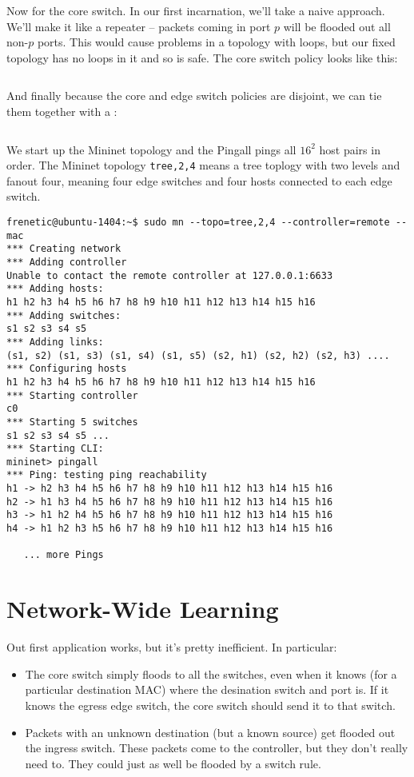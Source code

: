 Now for the core switch.  In our first incarnation, we'll take a naive approach.  We'll make it like
a repeater -- packets coming in port $p$ will be flooded out all non-$p$ ports.  This would cause problems
in a topology with loops, but our fixed topology has no loops in it and so is safe.  The core
switch policy looks like this:

\inputminted[firstline=42,lastline=49]{python}{code/multiswitch_topologies/multiswitch1.py}

And finally because the core and edge switch policies are disjoint, we can tie them together with a 
:

\inputminted[firstline=51,lastline=52]{python}{code/multiswitch_topologies/multiswitch1.py}

We start up the Mininet topology and the Pingall pings all $16^2$ host pairs in order.  The Mininet 
topology \texttt{tree,2,4} means a tree toplogy with two levels and fanout four, meaning four
edge switches and four hosts connected to each edge switch.   

\begin{verbatim}
frenetic@ubuntu-1404:~$ sudo mn --topo=tree,2,4 --controller=remote --mac
*** Creating network
*** Adding controller
Unable to contact the remote controller at 127.0.0.1:6633
*** Adding hosts:
h1 h2 h3 h4 h5 h6 h7 h8 h9 h10 h11 h12 h13 h14 h15 h16
*** Adding switches:
s1 s2 s3 s4 s5
*** Adding links:
(s1, s2) (s1, s3) (s1, s4) (s1, s5) (s2, h1) (s2, h2) (s2, h3) ....
*** Configuring hosts
h1 h2 h3 h4 h5 h6 h7 h8 h9 h10 h11 h12 h13 h14 h15 h16
*** Starting controller
c0
*** Starting 5 switches
s1 s2 s3 s4 s5 ...
*** Starting CLI:
mininet> pingall
*** Ping: testing ping reachability
h1 -> h2 h3 h4 h5 h6 h7 h8 h9 h10 h11 h12 h13 h14 h15 h16
h2 -> h1 h3 h4 h5 h6 h7 h8 h9 h10 h11 h12 h13 h14 h15 h16
h3 -> h1 h2 h4 h5 h6 h7 h8 h9 h10 h11 h12 h13 h14 h15 h16
h4 -> h1 h2 h3 h5 h6 h7 h8 h9 h10 h11 h12 h13 h14 h15 h16

   ... more Pings
\end{verbatim}

\section{Network-Wide Learning}

Out first application works, but it's pretty inefficient.  In particular:

\begin{itemize}
\item The core switch simply floods to all the switches, even when it knows (for a particular destination MAC)
where the desination switch and port is.  If it knows the egress edge switch, the core switch should send it to that switch.  
\item Packets with an unknown destination (but a known source) get flooded out the ingress switch.  
These packets come to the controller, but they don't really need to.  They could just as well be flooded 
by a switch rule.  
\end{itemize}

